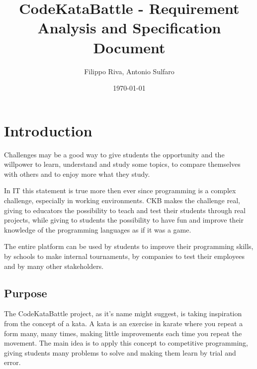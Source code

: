 \documentclass[11pt]{report}
\title{CodeKataBattle - Requirement Analysis and Specification Document}
\author{Filippo Riva, Antonio Sulfaro}
\date{\today}
\begin{document}
\begin{titlepage}
    \begin{figure}[t]
        \centering
    \end{figure}
    \begin{centering}
       \maketitle
    \end{centering}
\end{titlepage}

\tableofcontents


\chapter{Introduction}
    Challenges may be a good way to give students the opportunity and the willpower to learn,
    understand and study some topics, to compare themselves with others and to enjoy more
    what they study.

    In IT this statement is true more then ever since programming is a complex challenge,
    especially in working environments.
    CKB makes the challenge real, giving to educators the possibility to teach 
    and test their students through real projects, while giving to students the possibility to have fun 
    and improve their knowledge of the programming languages as if it was a game.

    The entire platform can be used by students to improve their programming skills, by schools 
    to make internal tournaments, by companies to test their employees and by many other stakeholders. 
    \\


    \section{Purpose}
    The CodeKataBattle project, as it's name might suggest, is taking inspiration from the concept 
    of a kata. A kata is an exercise in karate where you repeat a form many, many times, making
    little improvements each time you repeat the movement.
    The main idea is to apply this concept to competitive programming, giving students many
    problems to solve and making them learn by trial and error.
\end{document}
